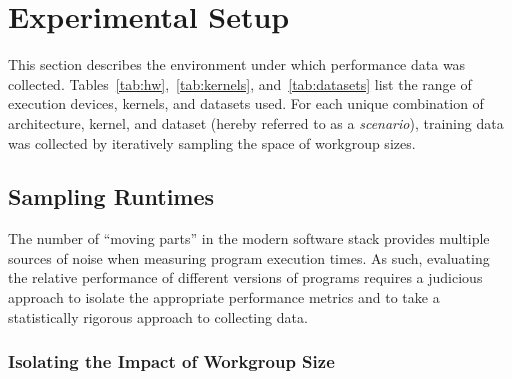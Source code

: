 \section{Experimental Setup}

This section describes the environment under which performance data
was collected. Tables~\ref{tab:hw},~\ref{tab:kernels},
and~\ref{tab:datasets} list the range of execution devices, kernels,
and datasets used. For each unique combination of architecture,
kernel, and dataset (hereby referred to as a \emph{scenario}),
training data was collected by iteratively sampling the space of
workgroup sizes.


\begin{table}

\caption{%
  Host machines.%
}
\label{tab:hosts}
\end{table}

\begin{table}

\caption{%
  OpenCL devices.%
}
\label{tab:hw}
\end{table}

\begin{table}

\caption{%
  Benchmark applications, border sizes, and static instruction counts.
  The ``simple'' and ``complex'' kernels are synthetic training
  programs. .
}
\label{tab:kernels}
\end{table}

\begin{table}

\caption{%
  Datasets used.%
}
\label{tab:datasets}
\end{table}


\subsection{Sampling Runtimes}

The number of ``moving parts'' in the modern software stack provides
multiple sources of noise when measuring program execution times. As
such, evaluating the relative performance of different versions of
programs requires a judicious approach to isolate the appropriate
performance metrics and to take a statistically rigorous approach to
collecting data.


\subsubsection{Isolating the Impact of Workgroup Size}

